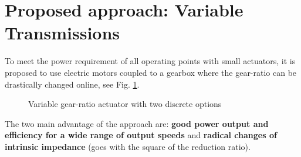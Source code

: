 %




\section{Proposed approach: Variable Transmissions}
\label{sec:ProposedSolutionRobotsUsingMultipleGearRatioActuators}


To meet the power requirement of all operating points with small actuators, it is proposed to use electric motors coupled to a gearbox where the gear-ratio can be drastically changed online, see Fig. \ref{fig:2s}. 

\begin{figure}[htb]
        \centering
        \caption{Variable gear-ratio actuator with two discrete options}\label{fig:2s}
\end{figure}


The two main advantage of the approach are: \textbf{good power output and efficiency for a wide range of output speeds} and \textbf{radical changes of intrinsic impedance} (goes with the square of the reduction ratio). 

